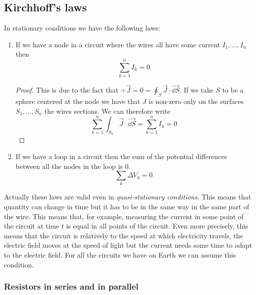 \documentclass[12pt]{extarticle}
\begin{document}
\subsection{Kirchhoff's laws}

In stationary conditions we have the following laws:
\begin{enumerate}
	\item If we have a node in a circuit where the wires all have some current $I_1, \dots, I_n$ then
	      \begin{equation}
		      \sum_{k=1}^{n} I_k = 0
	      \end{equation}
	      \begin{proof}
		      This is due to the fact that $\div \vec J = 0 = \oint_S \vec J \cdot \vec{\dd S}$.
		      If we take $S$ to be a sphere centered at the node we have that $J$ is non-zero only on the surfaces
		      $S_1, \dots, S_n$ the wires sections.
		      We can therefore write
		      \begin{equation}
			      \sum_{k = 1}^n \int_{S_k} \vec J \cdot \vec{\dd S} = \sum_{k = 1}^n I_k = 0
		      \end{equation}
	      \end{proof}

	\item If we have a loop in a circuit then the sum of the potential differences between
	      all the nodes in the loop is 0.
	      \begin{equation}
		      \sum_k \Delta V_k = 0
	      \end{equation}
\end{enumerate}

Actually these laws are valid even in \emph{quasi-stationary conditions}.
This means that quantity can change in time but it has to be in the same way in the same part of the wire.
This means that, for example, measuring the current in some point of the circuit at time $t$ is equal in all
points of the circuit.
Even more precisely, this means that the circuit is  relatively to the speed at which electricity travels,
the electric field moves at the speed of light but the current needs some time to adapt to the electric field.
For all the circuits we have on Earth we can assume this condition.

\subsubsection{Resistors in series and in parallel}
\end{document}
